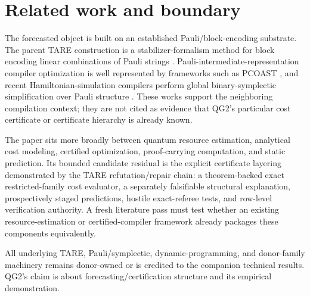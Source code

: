 \section{Related work and boundary}

The forecasted object is built on an established Pauli/block-encoding substrate. The parent TARE construction is a stabilizer-formalism method for block encoding linear combinations of Pauli strings \cite{schillo2026blockencoding}. Pauli-intermediate-representation compiler optimization is well represented by frameworks such as PCOAST \cite{paykin2023pcoast}, and recent Hamiltonian-simulation compilers perform global binary-symplectic simplification over Pauli structure \cite{yang2026symphony}. These works support the neighboring compilation context; they are not cited as evidence that QG2's particular cost certificate or certificate hierarchy is already known.

The paper sits more broadly between quantum resource estimation, analytical cost modeling, certified optimization, proof-carrying computation, and static prediction. Its bounded candidate residual is the explicit certificate layering demonstrated by the TARE refutation/repair chain: a theorem-backed exact restricted-family cost evaluator, a separately falsifiable structural explanation, prospectively staged predictions, hostile exact-referee tests, and row-level verification authority. A fresh literature pass must test whether an existing resource-estimation or certified-compiler framework already packages these components equivalently.

All underlying TARE, Pauli/symplectic, dynamic-programming, and donor-family machinery remains donor-owned or is credited to the companion technical results. QG2's claim is about forecasting/certification structure and its empirical demonstration.